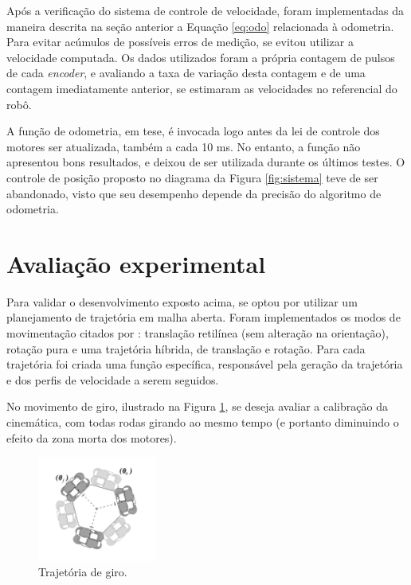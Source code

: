 Após a verificação do sistema de controle de velocidade, foram implementadas da maneira descrita na seção anterior a Equação \ref{eq:odo} relacionada à odometria. Para evitar acúmulos de possíveis erros de medição, se evitou utilizar a velocidade computada. Os dados utilizados foram a própria contagem de pulsos de cada \textit{encoder}, e avaliando a taxa de variação desta contagem e de uma contagem imediatamente anterior, se estimaram as velocidades no referencial do robô.

A função de odometria, em tese, é invocada logo antes da lei de controle dos motores ser atualizada, também a cada 10 ms. No entanto, a função não apresentou bons resultados, e deixou de ser utilizada durante os últimos testes. O controle de posição proposto no diagrama da Figura \ref{fig:sistema} teve de ser abandonado, visto que seu desempenho depende da precisão do algoritmo de odometria.

\section{Avaliação experimental}
\label{sec:experimental}

Para validar o desenvolvimento exposto acima, se optou por utilizar um planejamento de trajetória em malha aberta. Foram implementados os modos de movimentação citados por \citet{loh2003mechatronics}: translação retilínea (sem alteração na orientação), rotação pura e uma trajetória híbrida, de translação e rotação. Para cada trajetória foi criada uma função específica, responsável pela geração da trajetória e dos perfis de velocidade a serem seguidos.

No movimento de giro, ilustrado na Figura \ref{fig:giro}, se deseja avaliar a calibração da cinemática, com todas rodas girando ao mesmo tempo (e portanto diminuindo o efeito da zona morta dos motores).

\begin{figure}[h]
  \centering
  \includegraphics[width = 0.35\textwidth]{imagens/giro}
  \caption{Trajetória de giro.}
  \label{fig:giro}
\end{figure}

